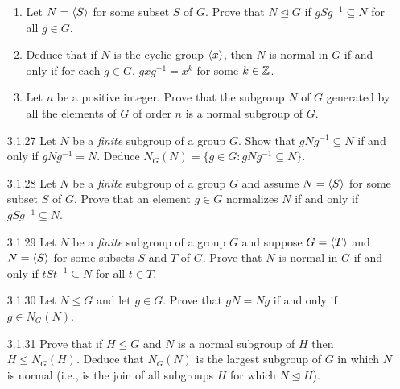 \begin{enumerate}
\begin{enumerate}
                     \item Let $N = \langle S \rangle$ for some subset $S$ of $G$. Prove
                           that $N \trianglelefteq G$ if $gSg^{-1} \subseteq N$
                           for all $g \in G$.
                     \item Deduce that if $N$ is the cyclic group $\langle x \rangle$,
                           then $N$ is normal in $G$ if and only if for each
                           $g \in G$, $gxg^{-1} = x^k$ for some $k \in \mathbb{Z}$.
                     \item Let $n$ be a positive integer. Prove that the
                           subgroup $N$ of $G$ generated by all the elements of
                           $G$ of order $n$ is a normal subgroup of $G$.
                  \end{enumerate}
   \item[3.1.27]  Let $N$ be a \textit{finite} subgroup of a group $G$. Show
                  that $gNg^{-1} \subseteq N$ if and only if $gNg^{-1} = N$.
                  Deduce $N_G(N) = \{g \in G : gNg^{-1} \subseteq N\}$.
   \item[3.1.28]  Let $N$ be a \textit{finite} subgroup of a group $G$ and
                  assume $N = \langle S \rangle$ for some subset $S$ of $G$. Prove that an
                  element $g \in G$ normalizes $N$ if and only if
                  $gSg^{-1} \subseteq N$.
   \item[3.1.29]  Let $N$ be a \textit{finite} subgroup of a group $G$ and
                  suppose $G = \langle T \rangle$ and $N = \langle S \rangle$ for some subsets $S$
                  and $T$ of $G$. Prove that $N$ is normal in $G$ if and only if
                  $tSt^{-1} \subseteq N$ for all $t \in T$.
   \item[3.1.30]  Let $N \le G$ and let $g \in G$. Prove that $gN = Ng$ if and
                  only if $g \in N_G(N)$.
   \item[3.1.31]  Prove that if $H \le G$ and $N$ is a normal subgroup of $H$
                  then $H \le N_G(H)$. Deduce that $N_G(N)$ is the largest
                  subgroup of $G$ in which $N$ is normal (i.e., is the join of
                  all subgroups $H$ for which $N \trianglelefteq H$).

\end{enumerate}
